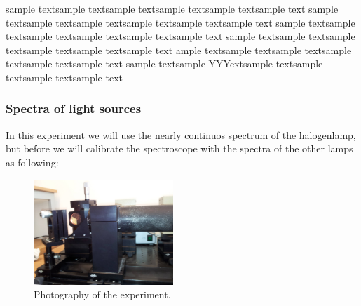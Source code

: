 sample textsample textsample textsample textsample textsample text
sample textsample textsample textsample textsample textsample text
sample textsample textsample textsample textsample textsample text
sample textsample textsample textsample textsample textsample text
ample textsample textsample textsample textsample textsample text
sample textsample YYYextsample textsample textsample textsample text
\subsubsection{Spectra of light sources}
In this experiment we will use the nearly continuos spectrum of
the halogenlamp, but before we will calibrate the spectroscope
with the spectra of the other lamps as following:
\par
\begin{figure}
  \begin{center}
    \includegraphics[width=0.47\textwidth]{pics/const4}
  \end{center}
\caption{Photography of the experiment.} 
  \vspace{-10pt}
 \label{fig:const4}

\end{figure}

